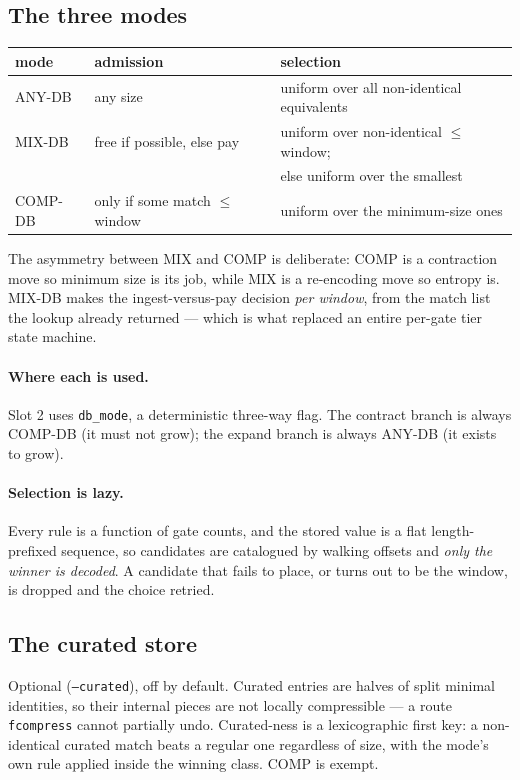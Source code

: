 \documentclass[11pt]{article}
\begin{document}
\subsection{The three modes}

\begin{center}
\begin{tabular}{lll}
\toprule
mode & admission & selection \\
\midrule
ANY-DB & any size & uniform over all non-identical equivalents \\
MIX-DB & free if possible, else pay & uniform over non-identical $\le$ window; \\
       &                            & else uniform over the smallest \\
COMP-DB & only if some match $\le$ window & uniform over the minimum-size ones \\
\bottomrule
\end{tabular}
\end{center}

The asymmetry between MIX and COMP is deliberate: COMP is a contraction move so
minimum size is its job, while MIX is a re-encoding move so entropy is. MIX-DB
makes the ingest-versus-pay decision \emph{per window}, from the match list the
lookup already returned --- which is what replaced an entire per-gate tier state
machine.

\paragraph{Where each is used.} Slot 2 uses \texttt{db_mode}, a deterministic
three-way flag. The contract branch is always COMP-DB (it must not grow); the
expand branch is always ANY-DB (it exists to grow).

\paragraph{Selection is lazy.} Every rule is a function of gate counts, and the
stored value is a flat length-prefixed sequence, so candidates are catalogued by
walking offsets and \emph{only the winner is decoded}. A candidate that fails to
place, or turns out to be the window, is dropped and the choice retried.

\subsection{The curated store}

Optional (\texttt{--curated}), off by default. Curated entries are halves of
split minimal identities, so their internal pieces are not locally compressible
--- a route \texttt{fcompress} cannot partially undo. Curated-ness is a
lexicographic first key: a non-identical curated match beats a regular one
regardless of size, with the mode's own rule applied inside the winning class.
COMP is exempt.
\end{document}
